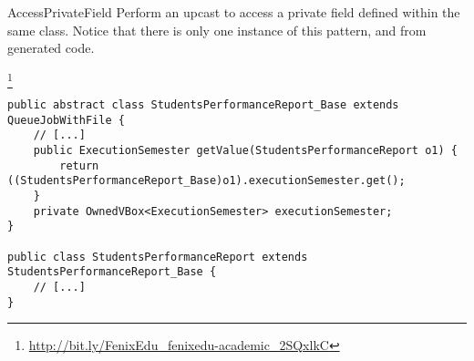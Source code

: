 \begin{pattern}{AccessPrivateField}
Perform an upcast to access a private field defined within the same class.
Notice that there is only one instance of this pattern,
and from generated code.

\instances{}

\footnote{\url{http://bit.ly/FenixEdu_fenixedu-academic_2SQxlkC}}

\begin{verbatim}
public abstract class StudentsPerformanceReport_Base extends QueueJobWithFile {
    // [...]
    public ExecutionSemester getValue(StudentsPerformanceReport o1) {
        return ((StudentsPerformanceReport_Base)o1).executionSemester.get();
    }
    private OwnedVBox<ExecutionSemester> executionSemester;
}
 
public class StudentsPerformanceReport extends StudentsPerformanceReport_Base {
    // [...]
}
\end{verbatim}

\detection{}

\discussion{}

\related{}

\end{pattern}